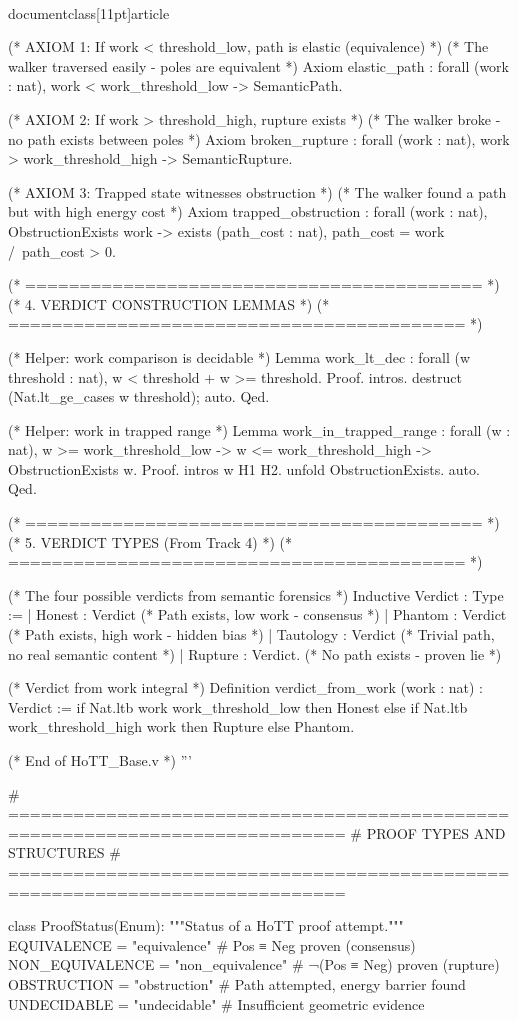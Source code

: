 \\documentclass[11pt]{article}
\begin{document}
\begin{CodeBlock}
(* AXIOM 1: If work < threshold_low, path is elastic (equivalence) *)
(* The walker traversed easily - poles are equivalent *)
Axiom elastic_path : forall (work : nat),
  work < work_threshold_low -> SemanticPath.

(* AXIOM 2: If work > threshold_high, rupture exists *)
(* The walker broke - no path exists between poles *)
Axiom broken_rupture : forall (work : nat),
  work > work_threshold_high -> SemanticRupture.

(* AXIOM 3: Trapped state witnesses obstruction *)
(* The walker found a path but with high energy cost *)
Axiom trapped_obstruction : forall (work : nat),
  ObstructionExists work ->
  exists (path_cost : nat), path_cost = work /\ path_cost > 0.

(* ========================================== *)
(* 4. VERDICT CONSTRUCTION LEMMAS *)
(* ========================================== *)

(* Helper: work comparison is decidable *)
Lemma work_lt_dec : forall (w threshold : nat),
  {w < threshold} + {w >= threshold}.
Proof.
  intros. destruct (Nat.lt_ge_cases w threshold); auto.
Qed.

(* Helper: work in trapped range *)
Lemma work_in_trapped_range : forall (w : nat),
  w >= work_threshold_low -> w <= work_threshold_high ->
  ObstructionExists w.
Proof.
  intros w H1 H2. unfold ObstructionExists. auto.
Qed.

(* ========================================== *)
(* 5. VERDICT TYPES (From Track 4) *)
(* ========================================== *)

(* The four possible verdicts from semantic forensics *)
Inductive Verdict : Type :=
  | Honest : Verdict       (* Path exists, low work - consensus *)
  | Phantom : Verdict      (* Path exists, high work - hidden bias *)
  | Tautology : Verdict    (* Trivial path, no real semantic content *)
  | Rupture : Verdict.     (* No path exists - proven lie *)

(* Verdict from work integral *)
Definition verdict_from_work (work : nat) : Verdict :=
  if Nat.ltb work work_threshold_low then Honest
  else if Nat.ltb work_threshold_high work then Rupture
  else Phantom.

(* End of HoTT_Base.v *)
'''


# =============================================================================
# PROOF TYPES AND STRUCTURES
# =============================================================================

class ProofStatus(Enum):
    """Status of a HoTT proof attempt."""
    EQUIVALENCE = "equivalence"          # Pos ≡ Neg proven (consensus)
    NON_EQUIVALENCE = "non_equivalence"  # ¬(Pos ≡ Neg) proven (rupture)
    OBSTRUCTION = "obstruction"          # Path attempted, energy barrier found
    UNDECIDABLE = "undecidable"          # Insufficient geometric evidence



\end{CodeBlock}
\end{document}
